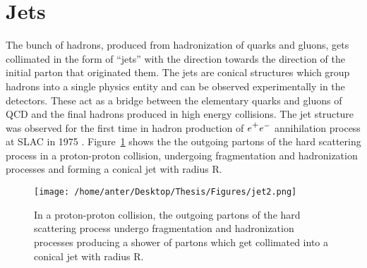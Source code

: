 \section{Jets}
\label{sec:jets}
The bunch of hadrons, produced from hadronization of quarks and gluons, gets collimated in the form of ``jets'' with the direction towards the direction of the initial parton that originated them. The jets \cite{Sterman:1977wj} are conical structures which group hadrons into a single physics entity and can be observed experimentally in the detectors. These act as a bridge between the elementary quarks and gluons of QCD and the final hadrons produced in high energy collisions. The jet structure was observed for the first time in hadron production of $e^\plusn e^-$ annihilation process at SLAC in 1975 \cite{Hanson:1975fe}. Figure~\ref{fig:jet_r} shows the the outgoing partons of the hard scattering process in a proton-proton collision, undergoing fragmentation and hadronization processes and forming a conical jet with radius R. \\
\begin{figure}[!h]
\begin{center}
\hspace*{-7mm}
\vspace{2mm}
\texttt{[image: /home/anter/Desktop/Thesis/Figures/jet2.png]}\\
\vspace*{4mm}
\caption[Formation of a jet in a proton-proton collision.]{In a proton-proton collision, the outgoing partons of the hard scattering process undergo fragmentation and hadronization processes producing a shower of partons which get collimated into a conical jet with radius R.}
\label{fig:jet_r}
\end{center}
\end{figure}

